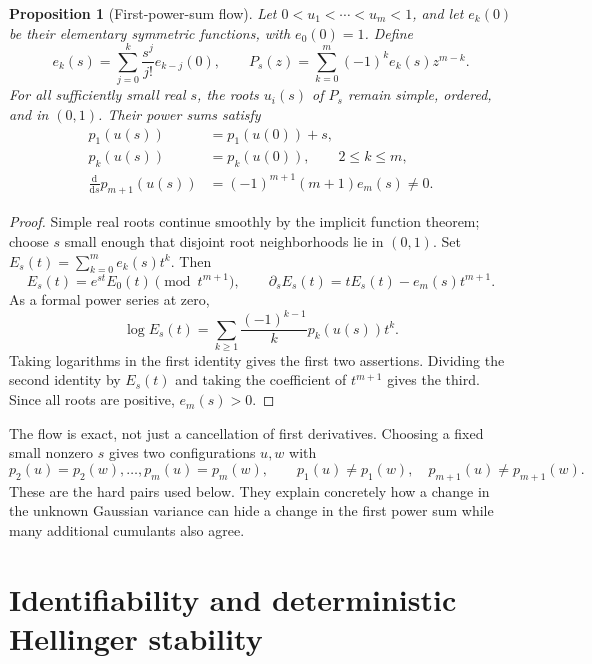 \documentclass[11pt,a4paper]{article}
\numberwithin{equation}{section}
\newtheorem{proposition}[theorem]{Proposition}
\theoremstyle{definition}
\theoremstyle{remark}
\begin{document}
\begin{proposition}[First-power-sum flow]
\label{prop:flow}
Let $0<u_1<\cdots<u_m<1$, and let $e_k(0)$ be their elementary symmetric
functions, with $e_0(0)=1$. Define
\begin{equation}
 e_k(s)=\sum_{j=0}^k\frac{s^j}{j!}e_{k-j}(0),\qquad
 P_s(z)=\sum_{k=0}^m(-1)^k e_k(s)z^{m-k}.
 \label{eq:flow}
\end{equation}
For all sufficiently small real $s$, the roots $u_i(s)$ of $P_s$ remain
simple, ordered, and in $(0,1)$. Their power sums satisfy
\begin{align}
 p_1(u(s))&=p_1(u(0))+s,\\
 p_k(u(s))&=p_k(u(0)),\qquad 2\le k\le m,\\
 \frac{\mathrm d}{\mathrm ds}p_{m+1}(u(s))
   &=(-1)^{m+1}(m+1)e_m(s)\ne0.
 \label{eq:flowidentities}
\end{align}
\end{proposition}
\begin{proof}
Simple real roots continue smoothly by the implicit function theorem; choose
$s$ small enough that disjoint root neighborhoods lie in $(0,1)$. Set
$E_s(t)=\sum_{k=0}^m e_k(s)t^k$. Then
\begin{equation}
 E_s(t)=e^{st}E_0(t)\pmod {t^{m+1}},\qquad
 \partial_s E_s(t)=tE_s(t)-e_m(s)t^{m+1}.
\end{equation}
As a formal power series at zero,
\begin{equation}
 \log E_s(t)=\sum_{k\ge1}\frac{(-1)^{k-1}}{k}p_k(u(s))t^k.
\end{equation}
Taking logarithms in the first identity gives the first two assertions.
Dividing the second identity by $E_s(t)$ and taking the coefficient of
$t^{m+1}$ gives the third. Since all roots are positive, $e_m(s)>0$.
\end{proof}

The flow is exact, not just a cancellation of first derivatives. Choosing a
fixed small nonzero $s$ gives two configurations $u,w$ with
\begin{equation}
 p_2(u)=p_2(w),\ldots,p_m(u)=p_m(w),\qquad
 p_1(u)\ne p_1(w),\quad p_{m+1}(u)\ne p_{m+1}(w).
 \label{eq:unknownpair}
\end{equation}
These are the hard pairs used below. They explain concretely how a change in
the unknown Gaussian variance can hide a change in the first power sum while
many additional cumulants also agree.

\section{Identifiability and deterministic Hellinger stability}
\label{sec:hellinger}
\end{document}
